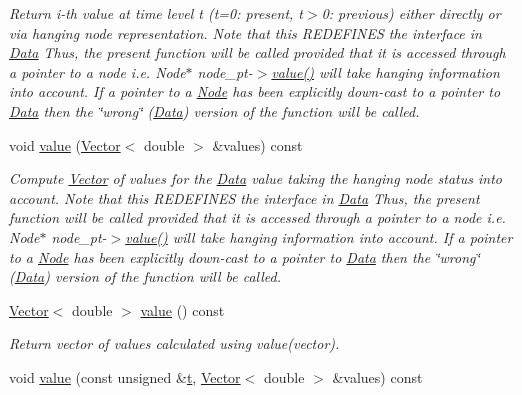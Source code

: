 \begin{DoxyCompactItemize}
\begin{DoxyCompactList}\small\item\em Return i-\/th value at time level t (t=0\+: present, t$>$0\+: previous) either directly or via hanging node representation. Note that this R\+E\+D\+E\+F\+I\+N\+ES the interface in \hyperlink{classoomph_1_1Data}{Data} Thus, the present function will be called provided that it is accessed through a pointer to a node i.\+e. Node$\ast$ node\+\_\+pt-\/$>$\hyperlink{classoomph_1_1Node_afcc5cdba40bca251826ae5bee5ca15b4}{value()} will take hanging information into account. If a pointer to a \hyperlink{classoomph_1_1Node}{Node} has been explicitly down-\/cast to a pointer to \hyperlink{classoomph_1_1Data}{Data} then the \char`\"{}wrong\char`\"{} (\hyperlink{classoomph_1_1Data}{Data}) version of the function will be called. \end{DoxyCompactList}\item 
void \hyperlink{classoomph_1_1Node_a3c9b6bdba6c5e33d2bb6b0a4799598ef}{value} (\hyperlink{classoomph_1_1Vector}{Vector}$<$ double $>$ \&values) const
\begin{DoxyCompactList}\small\item\em Compute \hyperlink{classoomph_1_1Vector}{Vector} of values for the \hyperlink{classoomph_1_1Data}{Data} value taking the hanging node status into account. Note that this R\+E\+D\+E\+F\+I\+N\+ES the interface in \hyperlink{classoomph_1_1Data}{Data} Thus, the present function will be called provided that it is accessed through a pointer to a node i.\+e. Node$\ast$ node\+\_\+pt-\/$>$\hyperlink{classoomph_1_1Node_afcc5cdba40bca251826ae5bee5ca15b4}{value()} will take hanging information into account. If a pointer to a \hyperlink{classoomph_1_1Node}{Node} has been explicitly down-\/cast to a pointer to \hyperlink{classoomph_1_1Data}{Data} then the \char`\"{}wrong\char`\"{} (\hyperlink{classoomph_1_1Data}{Data}) version of the function will be called. \end{DoxyCompactList}\item 
\hyperlink{classoomph_1_1Vector}{Vector}$<$ double $>$ \hyperlink{classoomph_1_1Node_a9be0d0a7d1b73eb4f8d3a7071b862547}{value} () const
\begin{DoxyCompactList}\small\item\em Return vector of values calculated using value(vector). \end{DoxyCompactList}\item 
void \hyperlink{classoomph_1_1Node_a8537fa95092b7d136a5a81a7b6f72bfc}{value} (const unsigned \&\hyperlink{cfortran_8h_af6f0bd3dc13317f895c91323c25c2b8f}{t}, \hyperlink{classoomph_1_1Vector}{Vector}$<$ double $>$ \&values) const

\end{DoxyCompactItemize}

